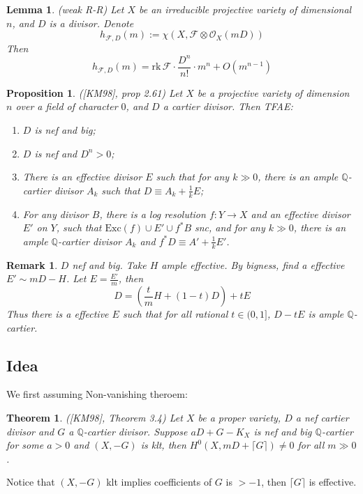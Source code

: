 \documentclass{article}
\newtheorem{prop}[defn]{Proposition}
\newtheorem{lem}[defn]{Lemma}
\newtheorem{thm}[defn]{Theorem}
\newtheorem{rmk}[defn]{Remark}
\begin{document}
\begin{lem}
  (weak R-R) Let $ X $ be an irreducible projective variety of dimensional $ n $, and $ D $ is a divisor. Denote
  \[ h_{\mathcal{F},D}(m):=\chi (X,\mathcal{F}\otimes \mathcal{O}_X(mD)) \]
  Then 
  \[ h_{\mathcal{F},D}(m)=\mathrm{rk}\,\mathcal{F}\cdot \frac{D^n}{n!}\cdot m^n+ O (m^{n-1})\]
\end{lem}

\begin{prop}
  ([KM98], prop 2.61) Let $ X $ be a projective variety of dimension $ n $ over a field of character $ 0 $, and $ D $ a cartier divisor. Then TFAE:
  \begin{enumerate}
    \item $ D $ is nef and big;
    \item $ D $ is nef and $ D^n>0 $;
    \item There is an effective divisor $ E $ such that for any $ k\gg 0 $, there is an ample $ \mathbb{Q} $-cartier divisor $ A_k $ such that $ D\equiv A_k+\frac{1}{k}E $;
    \item For any divisor $ B $, there is a log resolution $ f:Y\to X $ and an effective divisor $ E' $ on $ Y $, such that $ \mathrm{Exc}(f)\cup E'\cup f^*B $ snc, and for any $ k\gg 0 $, there is an ample $ \mathbb{Q} $-cartier divisor $ A_k $ and $ f^*D\equiv A'+\frac{1}{k}E' $.  
  \end{enumerate}
\end{prop}
\begin{rmk}
  $ D $ nef and big. Take $ H $ ample effective. By bigness, find a effective $ E'\sim mD-H $. Let $ E=\frac{E'}{m} $, then
  $$ D=(\frac{t}{m}H+(1-t)D)+tE $$ 
  Thus there is a effective $ E $ such that for all rational $ t\in (0,1]  $, $ D-tE $ is ample $ \mathbb{Q} $-cartier.
\end{rmk}
\subsection{Idea}
We first assuming Non-vanishing theroem:
\begin{thm}
  ([KM98], Theorem 3.4) Let $ X $ be a proper variety, $ D $ a nef cartier divisor and $ G $ a $ \mathbb{Q} $-cartier divisor. Suppose $ aD+G-K_X $ is nef and big $ \mathbb{Q} $-cartier for some $ a>0 $ and $ (X,-G) $ is klt, then $ H^0(X,mD+\lceil G \rceil)\neq 0 $ for all $ m\gg 0 $.
\end{thm}
Notice that $ (X,-G) $ klt implies coefficients of $ G $ is $ >-1 $, then $ \lceil G\rceil $ is effective.
\end{document}
